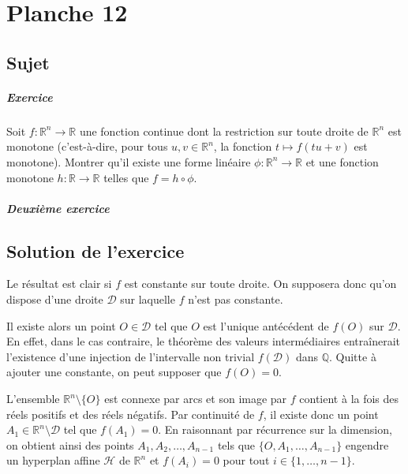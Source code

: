 \chapter{Planche 12}

\section{Sujet}

\paragraph{Exercice}
Soit $f : \mathbb R^n \to \mathbb R$ une fonction continue dont la restriction sur toute droite de $\mathbb R^n$ est monotone (c'est-à-dire, pour tous $u,v \in \mathbb R^n$, la fonction $t\mapsto f(tu+v)$ est monotone).
Montrer qu'il existe une forme linéaire $\phi : \mathbb R^n \to \mathbb R$ et une fonction monotone $h : \mathbb R \to \mathbb R$ telles que $f = h \circ \phi$.

\paragraph{Deuxième exercice}

\section{Solution de l'exercice}

Le résultat est clair si $f$ est constante sur toute droite.
On supposera donc qu'on dispose d'une droite $\mathcal D$ sur laquelle $f$ n'est pas constante.

Il existe alors un point $O \in \mathcal D$ tel que $O$ est l'unique antécédent de $f(O)$ sur $\mathcal D$. En effet, dans le cas contraire, le théorème des valeurs intermédiaires entraînerait l'existence d'une injection de l'intervalle non trivial $f(\mathcal D)$ dans $\mathbb Q$.
Quitte à ajouter une constante, on peut supposer que $f(O)=0$.

L'ensemble $\mathbb R^n \setminus\{O\}$ est connexe par arcs et son image par $f$ contient à la fois des réels positifs et des réels négatifs.
Par continuité de $f$, il existe donc un point $A_1 \in \mathbb R^n \setminus \mathcal D$ tel que $f(A_1) = 0$.
En raisonnant par récurrence sur la dimension, on obtient ainsi des points $A_1,A_2,\dots,A_{n-1}$ tels que $\{O,A_1,\dots,A_{n-1}\}$ engendre un hyperplan affine $\mathcal H$ de $\mathbb R^n$ et $f(A_i) = 0$ pour tout $i\in \{1,\dots,n-1\}$.

